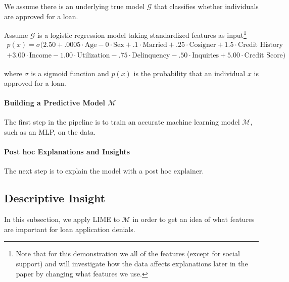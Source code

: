 \documentclass[mnsc,blindrev]{informs3}
\begin{document}
 We assume there is an underlying true model $\mathcal{G}$ that classifies whether individuals are approved for a loan. 
 
Assume $\mathcal{G}$ is a logistic regression model taking standardized features as input\footnote{Note that for this demonstration we all of the features (except for social support) and will investigate how the data affects explanations later in the paper by changing what features we use.}
\begin{equation}
\label{eqn:gt}
\begin{split}
 p(x) = \sigma(2.50 +.0005\cdot\text{Age} -0\cdot\text{Sex} +.1 \cdot \text{Married} + .25\cdot \text{Cosigner} + 1.5 \cdot \text{Credit History} \\  + 3.00 \cdot \text{Income} - 1.00\cdot\text{Utilization} -.75 \cdot \text{Delinquency} - .50\cdot\text{Inquiries} + 5.00\cdot\text{Credit Score})
\end{split}
\end{equation}
 
where $\sigma$ is a sigmoid function and $p(x)$ is the probability that an individual $x$ is approved for a loan.


\paragraph{Building a Predictive Model $\mathcal{M}$}
The first step in the pipeline is to train an accurate machine learning model $\mathcal{M}$, such as  an MLP, on the data. 


\paragraph{Post hoc Explanations and Insights}
The next step is to  explain the model with a post hoc explainer.
 

\subsection{Descriptive Insight}

In this subsection, we apply LIME to $\mathcal{M}$ in order to get an idea of what features are important for loan application denials. 
\end{document}
